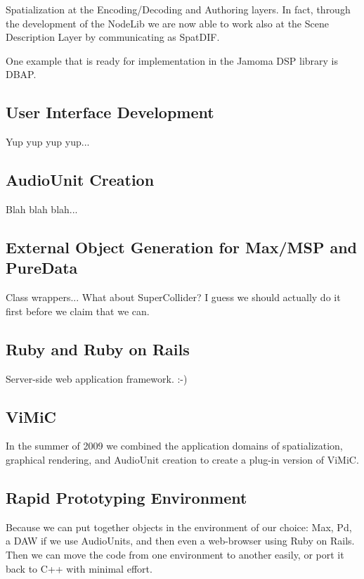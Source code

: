 \documentclass[twoside,10pt]{article}
\begin{document}
Spatialization at the Encoding/Decoding and Authoring layers\cite{Peters:2009}.  In fact, through the development of the NodeLib we are now able to work also at the Scene Description Layer by communicating as SpatDIF\cite{Peters:2008spatdif}.

One example that is ready for implementation in the Jamoma DSP library is DBAP\cite{Lossius:2009}.


\subsection{User Interface Development}

Yup yup yup yup...

\subsection{AudioUnit Creation}

Blah blah blah...

\subsection{External Object Generation for Max/MSP and PureData}

Class wrappers...  What about SuperCollider?  I guess we should actually do it first before we claim that we can.

\subsection{Ruby and Ruby on Rails}

Server-side web application framework.  :-)

\subsection{ViMiC}
In the summer of 2009 we combined the application domains of spatialization, graphical rendering, and AudioUnit creation to create a plug-in version of ViMiC\cite{Peters:2008b}.


\subsection{Rapid Prototyping Environment}

Because we can put together objects in the environment of our choice: Max, Pd, a DAW if we use AudioUnits, and then even a web-browser using Ruby on Rails.  Then we can move the code from one environment to another easily, or port it back to C++ with minimal effort.
\end{document}

